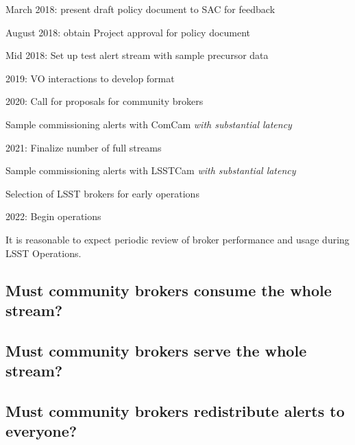 March 2018: present draft policy document to SAC for feedback

August 2018: obtain Project approval for policy document

Mid 2018: Set up test alert stream with sample precursor data

2019: VO interactions to develop format

2020: Call for proposals for community brokers

	Sample commissioning alerts with ComCam \textit{with substantial latency}

2021: Finalize number of full streams

	Sample commissioning alerts with LSSTCam \textit{with substantial latency}

	Selection of LSST brokers for early operations

2022: Begin operations

It is reasonable to expect periodic review of broker performance and usage during LSST Operations.


\subsection{Must community brokers consume the whole stream?}

\subsection{Must community brokers serve the whole stream?}

\subsection{Must community brokers redistribute alerts to everyone?}

